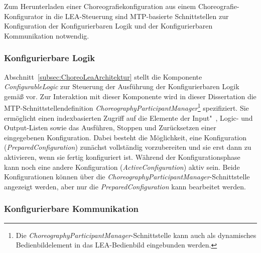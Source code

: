 Zum Herunterladen einer Choreografiekonfiguration aus einem Choreografie-Kon\-fi\-gu\-ra\-tor in die LEA-Steuerung sind MTP-basierte Schnittstellen zur Konfiguration der Konfigurierbaren Logik und der Konfigurierbaren Kommunikation notwendig.

\subsubsection{Konfigurierbare Logik}

Abschnitt~\ref{subsec:ChoreoLeaArchitektur} stellt die Komponente \emph{ConfigurableLogic} zur Steuerung der Aus\-füh\-rung der Konfigurierbaren Logik gemäß \cite{Stutz.2026} vor. Zur Interaktion mit dieser Komponente wird in dieser Dissertation die MTP-Schnitt\-stel\-len\-de\-fi\-ni\-ti\-on \emph{ChoreographyParticipantManager}\footnote{Die \emph{ChoreographyParticipantManager}-Schnittstelle kann auch als dynamisches Bedienbildelement in das LEA-Bedienbild eingebunden werden.} spezifiziert. Sie ermöglicht einen indexbasierten Zugriff auf die Elemente der Input"~, Logic- und Output-Listen sowie das Ausführen, Stoppen und Zurücksetzen einer eingegebenen Konfiguration. Dabei besteht die Möglichkeit, eine Konfiguration (\emph{PreparedConfiguration}) zunächst vollständig vorzubereiten und sie erst dann zu aktivieren, wenn sie fertig konfiguriert ist. Während der Konfigurationsphase kann noch eine andere Konfiguration (\emph{ActiveConfiguration}) aktiv sein. Beide Konfigurationen können über die \emph{ChoreographyParticipantManager}-Schnittstelle angezeigt werden, aber nur die \emph{PreparedConfiguration} kann bearbeitet werden.


\subsubsection{Konfigurierbare Kommunikation}

